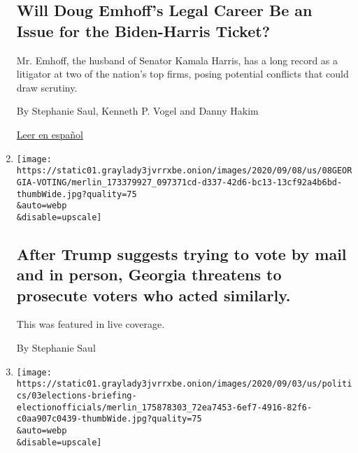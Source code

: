 \begin{enumerate}
  \hypertarget{will-doug-emhoffs-legal-career-be-an-issue-for-the-biden-harris-ticket}{%
  \subsection{Will Doug Emhoff's Legal Career Be an Issue for the
  Biden-Harris
  Ticket?}\label{will-doug-emhoffs-legal-career-be-an-issue-for-the-biden-harris-ticket}}

  Mr. Emhoff, the husband of Senator Kamala Harris, has a long record as
  a litigator at two of the nation's top firms, posing potential
  conflicts that could draw scrutiny.

  By Stephanie Saul, Kenneth P. Vogel and Danny Hakim

  \href{https://www.nytimes3xbfgragh.onion/es/2020/09/11/espanol/doug-emhoff-esposo-kamala-harris.html}{Leer
  en español}
\item
  \href{/live/2020/09/08/us/trump-vs-biden/after-trump-suggests-trying-to-vote-by-mail-and-in-person-georgia-threatens-to-prosecute-voters-who-acted-similarly}{}

  \texttt{[image: https://static01.graylady3jvrrxbe.onion/images/2020/09/08/us/08GEORGIA-VOTING/merlin\_173379927\_097371cd-d337-42d6-bc13-13cf92a4b6bd-thumbWide.jpg?quality=75\\\&auto=webp\\\&disable=upscale]}

  \hypertarget{after-trump-suggests-trying-to-vote-by-mail-and-in-person-georgia-threatens-to-prosecute-voters-who-acted-similarly}{%
  \subsection{After Trump suggests trying to vote by mail and in person,
  Georgia threatens to prosecute voters who acted
  similarly.}\label{after-trump-suggests-trying-to-vote-by-mail-and-in-person-georgia-threatens-to-prosecute-voters-who-acted-similarly}}

  This was featured in live coverage.

  By Stephanie Saul
\item
  \href{/2020/09/04/us/elections/trumps-advice-to-vote-twice-gives-state-elections-officials-new-headaches.html}{}

  \texttt{[image: https://static01.graylady3jvrrxbe.onion/images/2020/09/03/us/politics/03elections-briefing-electionofficials/merlin\_175878303\_72ea7453-6ef7-4916-82f6-c0aa907c0439-thumbWide.jpg?quality=75\\\&auto=webp\\\&disable=upscale]}

  \hypertarget{trumps-advice-to-vote-twice-gives-state-elections-officials-new-headaches}{%
}
\end{enumerate}
